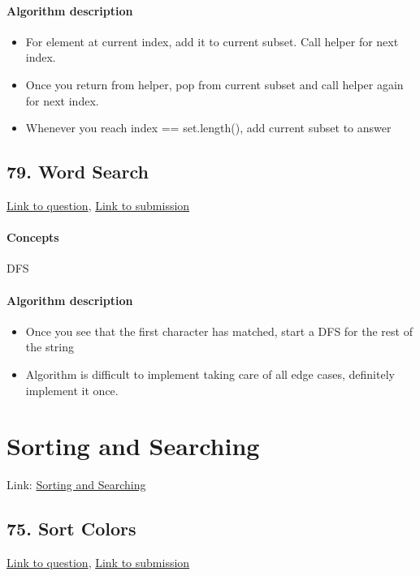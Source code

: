 \documentclass[11pt]{book}
\begin{document}
\paragraph{Algorithm description}
\begin{itemize}
    \item For element at current index, add it to current subset. Call helper for next index.
    \item Once you return from helper, pop from current subset and call helper again for next index.
    \item Whenever you reach index == set.length(), add current subset to answer
\end{itemize}

\subsection{79. Word Search}
\href{https://leetcode.com/problems/word-search/}{Link to question},
\href{https://leetcode.com/submissions/detail/338952848/}{Link to submission}
\paragraph{Concepts}
DFS
\paragraph{Algorithm description}
\begin{itemize}
    \item Once you see that the first character has matched, start a DFS for the rest of the string
    \item Algorithm is difficult to implement taking care of all edge cases, definitely implement it once.
\end{itemize}

\section{Sorting and Searching}
Link: \href{https://leetcode.com/explore/interview/card/top-interview-questions-medium/110/sorting-and-searching/}{Sorting and Searching}

\subsection{75. Sort Colors}
\href{https://leetcode.com/problems/sort-colors/}{Link to question},
\href{https://leetcode.com/submissions/detail/338972134/}{Link to submission}
\end{document}
